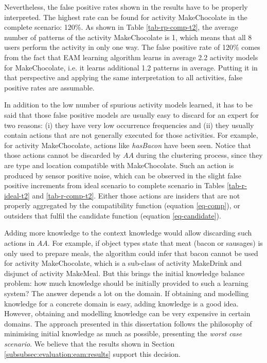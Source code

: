 Nevertheless, the false positive rates shown in the results have to be properly interpreted. The highest rate can be found for activity MakeChocolate in the complete scenario: 120\%. As shown in Table \ref{tab-rp-comp-t2}, the average number of patterns of the activity MakeChocolate is 1, which means that all 8 users perform the activity in only one way. The false positive rate of 120\% comes from the fact that EAM learning algorithm learns in average 2.2 activity models for MakeChocolate, i.e. it learns additional 1.2 patterns in average. Putting it in that perspective and applying the same interpretation to all activities, false positive rates are assumable.

In addition to the low number of spurious activity models learned, it has to be said that those false positive models are usually easy to discard for an expert for two reasons: (i) they have very low occurrence frequencies and (ii) they usually contain actions that are not generally executed for those activities. For example, for activity MakeChocolate, actions like \textit{hasBacon} have been seen. Notice that those actions cannot be discarded by $AA$ during the clustering process, since they are type and location compatible with MakeChocolate. Such an action is produced by sensor positive noise, which can be observed in the slight false positive increments from ideal scenario to complete scenario in Tables \ref{tab-r-ideal-t2} and \ref{tab-r-comp-t2}. Either those actions are insiders that are not properly aggregated by the compatibility function (equation \ref{eq-comp}), or outsiders that fulfil the candidate function (equation \ref{eq-candidate}). 

Adding more knowledge to the context knowledge would allow discarding such actions in $AA$. For example, if object types state that meat (bacon or sausages) is only used to prepare meals, the algorithm could infer that bacon cannot be used for activity MakeChocolate, which is a sub-class of activity MakeDrink and disjunct of activity MakeMeal. But this brings the initial knowledge balance problem: how much knowledge should be initially provided to such a learning system? The answer depends a lot on the domain. If obtaining and modelling knowledge for a concrete domain is easy, adding knowledge is a good idea. However, obtaining and modelling knowledge can be very expensive in certain domains. The approach presented in this dissertation follows the philosophy of minimising initial knowledge as much as possible, presenting the \textit{worst case scenario}. We believe that the results shown in Section \ref{subsubsec:evaluation:eam:results} support this decision. 

